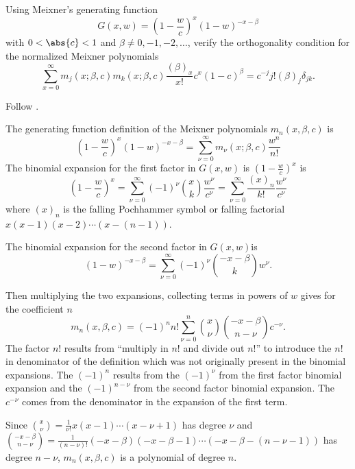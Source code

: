 \documentclass[12pt]{article}
\begin{document}
\begin{exercise}
    Using Meixner's generating function
    \[
        G(x,w) =\left( 1 - \frac{w}{c} \right)^x \left( 1-w \right)^{-x-\beta}
    \] with \( 0 < \abs{c} < 1 \) and \( \beta \ne 0, -1, -2, \dots \),
    verify the orthogonality condition for the normalized Meixner
    polynomials
    \[
        \sum_{x=0}^{\infty} m_j(x; \beta, c) m_k(x; \beta, c) \frac{(\beta)_x}
        {x!} c^x \left(1-c \right)^\beta = c^{-j} j!  (\beta)_j \delta_{jk}.
    \]
\end{exercise}
\begin{solution}
    Follow
    \cite[pages 4 and 176]{chihara78}.

    The generating function definition of the Meixner polynomials \( m_n
    (x,\beta,c) \) is
    \[
        \left( 1 - \frac{w}{c} \right)^x \left( 1-w \right)^{-x-\beta} =
        \sum_{\nu=0}^{\infty} m_{\nu}(x;\beta,c) \frac{w^n}{n!}
    \] The binomial expansion for the first factor in \( G(x,w) \) is \(
    \left( 1 - \frac{w}{c} \right)^x \) is
    \[
        \left( 1 - \frac{w}{c} \right)^x = \sum_{\nu=0}^{\infty} (-1)^{\nu}
        \binom{x}{k} \frac{w^\nu}{c^{\nu}} = \sum_{\nu=0}^{\infty}
        \frac{(x)_n}{k!} \frac{w^\nu}{c^{\nu}}
    \] where \( (x)_n \) is the falling Pochhammer symbol or falling
    factorial \( x(x-1)(x-2)\cdots(x-(n-1)) \).

    The binomial expansion for the second factor in \( G(x,w) \)is
    \[
        \left( 1-w \right)^{-x-\beta} = \sum_{\nu=0}^{\infty} (-1)^{\nu}\binom
        {-x-\beta}{k} w^\nu.
    \]

    Then multiplying the two expansions, collecting terms in powers of \(
    w \) gives for the coefficient \( n \)
    \[
        m_n(x,\beta,c) = (-1)^n n!  \sum_{\nu=0}^n \binom{x}{\nu} \binom
        {-x-\beta}{n-\nu} c^{-\nu}.
    \] The factor \( n! \) results from ``multiply in \( n! \) and
    divide out \( n! \)'' to introduce the \( n! \) in denominator of
    the definition which was not originally present in the binomial
    expansions.  The \( (-1)^n \) results from the \( (-1)^\nu \) from
    the first factor binomial expansion and the \( (-1)^{n-\nu} \) from
    the second factor binomial expansion.  The \( c^{-\nu} \) comes from
    the denominator in the expansion of the first term.

    Since \( \binom{x}{\nu} = \frac{1}{\nu!} x(x-1)\cdots(x-\nu+1) \)
    has degree \( \nu \) and \( \binom{-x-\beta}{n-\nu} = \frac{1}{(n-\nu)!}
    (-x-\beta)(-x-\beta-1)\cdots(-x-\beta-(n-\nu-1)) \) has degree \( n-\nu
    \), \( m_n(x,\beta,c) \) is a polynomial of degree \( n \).


\end{solution}
\end{document}
